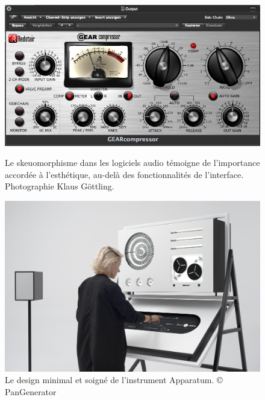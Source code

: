 \begin{figure}[!htbp]
	\captionsetup{format=plain}%
	\centering
	\begin{minipage}[t]{0.48\textwidth}
		\includegraphics[width=\linewidth]{gfx/06_visual_representation/Redstair_GEARcompressor.png}
		\caption[Skeuomorphisme dans les logiciels audio]{Le skeuomorphisme dans les logiciels audio témoigne de l'importance accordée à l'esthétique, au-delà des fonctionnalités de l'interface. Photographie Klaus Göttling.}
		\label{fig:visual_representation:skeuomorphisme}
	\end{minipage}
	\hspace{.02\linewidth}
	\begin{minipage}[t]{0.48\textwidth}
	    \includegraphics[width=\linewidth]{gfx/06_visual_representation/2018_06_26_PAN_GENERATOR_APPARATUM0396.jpg}
		\caption[Apparatum, par PanGenerator]{Le design minimal et soigné de l'instrument Apparatum. © PanGenerator}
		\label{fig:visual_representation:apparatum}
	\end{minipage}
\end{figure}

